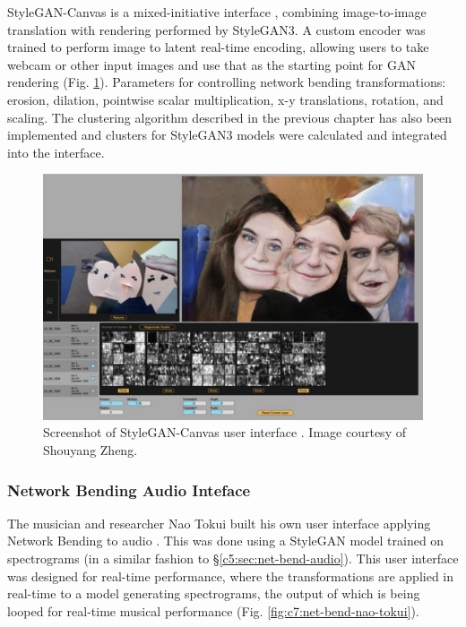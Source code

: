 StyleGAN-Canvas is a mixed-initiative interface \citep{zheng2023stylegan}, combining image-to-image translation with rendering performed by StyleGAN3. 
A custom encoder was trained to perform image to latent real-time encoding, allowing users to take webcam or other input images and use that as the starting point for GAN rendering  (Fig. \ref{fig:c7:stylegan-canvas}). 
Parameters for controlling network bending transformations: erosion, dilation, pointwise scalar multiplication, x-y translations, rotation, and scaling.
The clustering algorithm described in the previous chapter has also been implemented and clusters for StyleGAN3 models were calculated and integrated into the interface.

\begin{figure}[!htb]
    \centering
    \captionsetup{justification=centering}
    \includegraphics[width=1\textwidth]{figures/c7_impact/net-bend-technical/stylegan-canvas.png}
    \caption[StyleGAN-Canvas user interface]{Screenshot of StyleGAN-Canvas user interface \citep{zheng2023stylegan}. Image courtesy of Shouyang Zheng.}
    \label{fig:c7:stylegan-canvas}
\end{figure}

\subsubsection{Network Bending Audio Inteface}
\label{c7:subsubsec:naotokui}

The musician and researcher Nao Tokui built his own user interface applying Network Bending to audio \cite{tokui2023bending}. 
This was done using a StyleGAN model trained on spectrograms (in a similar fashion to \S \ref{c5:sec:net-bend-audio}).
This user interface was designed for real-time performance, where the transformations are applied in real-time to a model generating spectrograms, the output of which is being looped for real-time musical performance  (Fig. \ref{fig:c7:net-bend-nao-tokui}).

